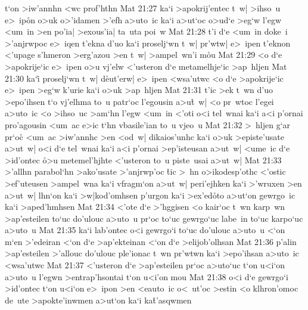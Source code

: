 t`on
>iw'annhn
<wc
prof'hthn\bibvsend
\vs Mat 21:27
ka`i
>apokrij'entec
t~w|
>ihso~u
e>~ip\r{o}n
o>uk
o>'idamen
>'efh
a>uto~ic
ka`i
a>ut`oc
o>ud`e
>eg`w
l'egw
<um~in
>en
po'ia|
>exous'ia|
ta~uta
poi~w\bibvsend
\vs Mat 21:28
t'i
d`e
<um~in
doke~i
>'anjrwpoc
e>~iqen
t'ekna
d'uo
ka`i
proselj`wn
t~w|
pr'wtw|
e>~ipen
t'eknon
<'upage
s'hmeron
>erg'azou
>en
t~w|
>ampel~wn'i
m\r{o}u\bibvsend
{}
\vs Mat 21:29
<o
d`e
>apokrije`ic
e>~ipen
o>u
vj'elw
<'usteron
d`e
metamelhje`ic
>ap~hljen\bibvsend
\vs Mat 21:30
ka`i\r{}
proselj`wn
t~w|
d\r{e}ut'erw|
e>~ipen
<wsa'utwc
<o
d`e
>apokrije`ic
e>~ipen
>eg`w
k'urie
ka`i
o>uk
>ap~hljen\bibvsend
\vs Mat 21:31
t'ic
>ek
t~wn
d'uo
>epo'ihsen
t`o
vj'elhma
to~u
patr`oc
l'egousin
a>u\r{t}~w|
<o
pr~wtoc
l'egei
a>uto~ic
<o
>ihso~uc
>am`hn
l'egw
<um~in
<'oti
o<i
tel~wnai
ka`i
a<i
p'ornai
pro'agousin
<um~ac
e>ic
t`hn
vbasile'ian
to~u
vjeo~u\bibvsend
\vs Mat 21:32
>~hljen
g`ar
pr`oc\r{}
<um~ac
>iw'annhc
>en
<od~w|
dikaios'unhc
ka`i
o>uk
>episte'usate
a>ut~w|
o<i
d`e
tel~wnai
ka`i
a<i
p'ornai
>ep'isteusan
a>ut~w|
<ume~ic
d`e
>id'ontec
\r{o}>u
metemel'hjhte
<'usteron
to~u
piste~usai
a>ut~w|\bibvsend
\vs Mat 21:33
>'allhn
parabol`hn
>ako'usate
>'anjrwp'oc
\r{t}ic
>~hn
o>ikodesp'othc
<'ostic
>ef'uteusen
>ampel~wna
ka`i
vfragm`on
a>ut~w|
peri'ejhken
ka`i
>'wruxen
>en
a>ut~w|
lhn`on
ka`i
>w|kod'omhsen
p'urgon
ka`i
>ex'ed\r{o}to
a>ut`on
gewrgo~ic
ka`i
>aped'hmhsen\bibvsend
\vs Mat 21:34
<'ote
d`e
>'hggisen
<o
kair`oc
t~wn
karp~wn
>ap'esteilen
to`uc
do'ulouc
a>uto~u
pr`oc
to`uc
gewrgo`uc
labe~in
to`uc
karpo`uc
a>uto~u\bibvsend
\vs Mat 21:35
ka`i
lab'ontec
o<i
gewrgo`i
to`uc
do'ulouc
a>uto~u
<`on
m`en
>'edeiran
<`on
d`e
>ap'ekteinan
<`on
d`e
>elijob'olhsan\bibvsend
\vs Mat 21:36
p'alin
>ap'esteilen
>'allouc
do'ulouc
ple'ionac
t~wn
pr'wtwn
ka`i
>epo'ihsan
a>uto~ic
<wsa'utwc\bibvsend
\vs Mat 21:37
<'usteron
d`e
>ap'esteilen
pr`oc
a>uto`uc
t`on
u<i`on
a>uto~u
l'egwn
>entrap'hsontai
t`on
u<i'on
mou\bibvsend
\vs Mat 21:38
o<i
d`e
gewrgo`i
>id'ontec
t`on
u<i`on
e>~ipon
>en
<eauto~ic
o<~ut'oc
>estin
<o
klhron'omoc
de~ute
>apokte'inwmen
a>ut`on
ka`i
ka\r{t}'asqwmen
